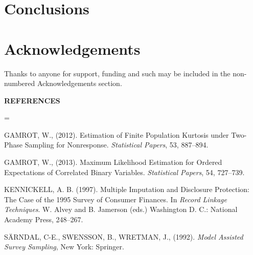 \documentclass[10pt,twoside]{article}
\begin{document}
\lipsum[1]

\section{Conclusions}

\lipsum[1]

\section*{Acknowledgements}

Thanks to anyone for support, funding and such may be included in the non-numbered Acknowledgements section.


\noindent \begin{center}\begin{large}{\bf REFERENCES}\end{large}\end{center}

\everypar = {
\parindent=0pt
\hangindent=8mm
}\noindent 

GAMROT, W., (2012). Estimation of Finite Population Kurtosis under Two-Phase Sampling for Nonresponse. \textit{Statistical Papers}, 53, 887--894.

GAMROT, W., (2013). Maximum Likelihood Estimation for Ordered Expectations of Correlated Binary Variables. \textit{Statistical Papers}, 54, 727--739.

KENNICKELL, A. B. (1997). Multiple Imputation and Disclosure Protection:
The Case of the 1995 Survey of Consumer Finances. In \textit{Record Linkage
Techniques}. W. Alvey and B. Jamerson (eds.) Washington D. C.: National
Academy Press, 248--267.

S\"{A}RNDAL, C-E., SWENSSON, B., WRETMAN, J., (1992). \textit{Model Assisted
Survey Sampling}, New York: Springer.
\end{document}
